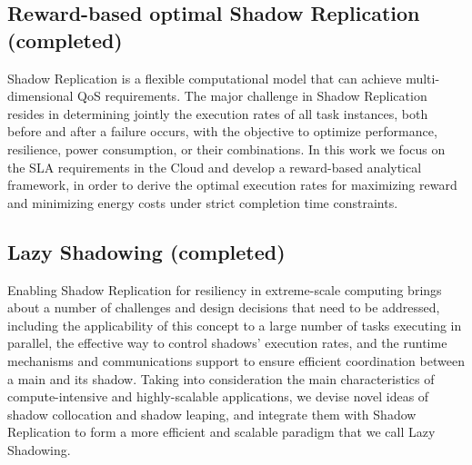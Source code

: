 
\subsection{Reward-based optimal Shadow Replication (completed)}
Shadow Replication is a flexible computational model that can achieve multi-dimensional QoS requirements. 
The major challenge in Shadow Replication resides in determining jointly the execution rates of all task instances, 
both before and after a failure occurs, with the objective to optimize performance, resilience, power consumption, or their combinations.
In this work we focus on the SLA requirements in the Cloud and develop a reward-based analytical framework, in order to derive the optimal execution rates for maximizing reward and minimizing energy 
costs under strict completion time constraints. 




\subsection{Lazy Shadowing (completed)}

Enabling Shadow Replication for resiliency in extreme-scale computing brings about a number of challenges and design decisions 
that need to be addressed, including the applicability of this concept to a large number of tasks executing in parallel, 
the effective way to control shadows’ execution rates, and the runtime mechanisms and communications support to ensure efficient 
coordination between a main and its shadow. Taking into consideration the main characteristics of compute-intensive and 
highly-scalable applications, 
we devise novel ideas of shadow collocation and shadow leaping, and integrate them with Shadow Replication to form a more efficient and scalable paradigm that we call Lazy Shadowing.

